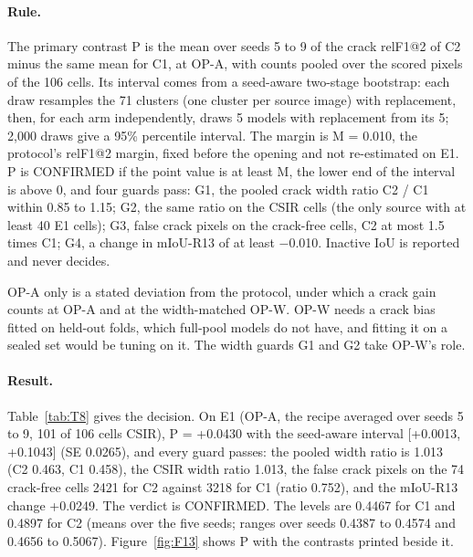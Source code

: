 \paragraph{Rule.} The primary contrast P is the mean over seeds 5 to 9 of the crack relF1@2 of C2 minus the same mean for C1, at
OP-A, with counts pooled over the scored pixels of the 106 cells. Its interval comes from a seed-aware two-stage bootstrap: each
draw resamples the 71 clusters (one cluster per source image) with replacement, then, for each arm independently, draws 5
models with replacement from its 5; 2,000 draws give a 95\% percentile interval. The margin is M = 0.010, the protocol's
relF1@2 margin, fixed before the opening and not re-estimated on E1. P is CONFIRMED if the point value is at least M, the lower
end of the interval is above 0, and four guards pass: G1, the pooled crack width ratio C2 / C1 within 0.85 to 1.15; G2, the same
ratio on the CSIR cells (the only source with at least 40 E1 cells); G3, false crack pixels on the crack-free cells, C2 at most
1.5 times C1; G4, a change in mIoU-R13 of at least $-$0.010. Inactive IoU is reported and never decides.

OP-A only is a stated deviation from the protocol, under which a crack gain counts at OP-A and at the width-matched OP-W.
OP-W needs a crack bias fitted on held-out folds, which full-pool models do not have, and fitting it on a sealed set would be
tuning on it. The width guards G1 and G2 take OP-W's role.

\paragraph{Result.} Table~\ref{tab:T8} gives the decision. On E1 (OP-A, the recipe averaged over seeds 5 to 9, 101 of 106 cells
CSIR), P = +0.0430 with the seed-aware interval [+0.0013, +0.1043] (SE 0.0265), and every guard passes: the pooled width ratio is
1.013 (C2 0.463, C1 0.458), the CSIR width ratio 1.013, the false crack pixels on the 74 crack-free cells 2421 for C2 against 3218
for C1 (ratio 0.752), and the mIoU-R13 change +0.0249. The verdict is CONFIRMED. The levels are 0.4467 for C1 and 0.4897 for C2
(means over the five seeds; ranges over seeds 0.4387 to 0.4574 and 0.4656 to 0.5067). Figure~\ref{fig:F13} shows P with the contrasts
printed beside it.



